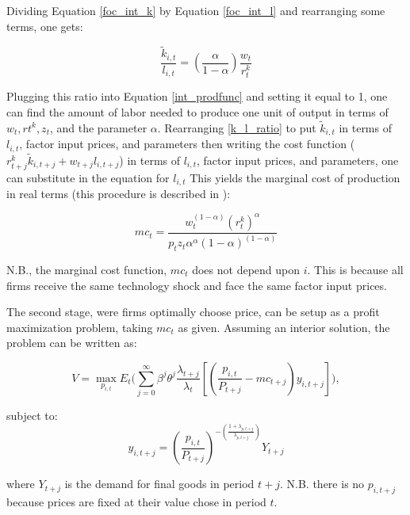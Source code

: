 \documentclass[article,11pt,letterpaper,fleqn]{article}
\theoremstyle{definition}
\numberwithin{equation}{section}
\newcommand{\cn}{\citeasnoun} %
\begin{document}
Dividing Equation \ref{foc_int_k} by Equation \ref{foc_int_l} and rearranging some terms, one gets:

\begin{equation}
\label{k_l_ratio}
\frac{\tilde{k}_{i,t}}{l_{i,t}}=\left(\frac{\alpha}{1-\alpha}\right)\frac{w_{t}}{r_{t}^{k}}
\end{equation}


Plugging this ratio into Equation \ref{int_prodfunc} and setting it equal to 1, one can find the amount of labor needed to produce one unit of output in terms of $w_{t}, r{t}^{k}, z_{t}$, and the parameter $\alpha$.  Rearranging \ref{k_l_ratio} to put $\tilde{k}_{i,t}$ in terms of $l_{i,t}$, factor input prices, and parameters then writing the cost function ($r_{t+j}^{k}\tilde{k}_{i,t+j}+w_{t+j}l_{i,t+j}$) in terms of $l_{i,t}$, factor input prices, and parameters, one can substitute in the equation for $l_{i,t}$ This yields the marginal cost of production in real terms (this procedure is described in \cn{FVRR2006}):

\begin{equation}
mc_{t}=\frac{w_{t}^{(1-\alpha)}(r_{t}^{k})^{\alpha}}{p_{t}z_{t}\alpha^{\alpha}(1-\alpha)^{(1-\alpha)}}
\end{equation}

\noindent\noindent N.B., the marginal cost function, $mc_{t}$ does not depend upon $i$.  This is because all firms receive the same technology shock and face the same factor input prices.

The second stage, were firms optimally choose price, can be setup as a profit maximization problem, taking $mc_{t}$ as given.  Assuming an interior solution, the problem can be written as:

\begin{equation}
V=\max_{p_{i,t}}E_{t}\Biggl(\sum_{j=0}^{\infty}\beta^{j}\theta^{j}\frac{\lambda_{t+j}}{\lambda_{t}}\left[\left(\frac{p_{i,t}}{P_{t+j}}-mc_{t+j}\right)y_{i,t+j}\right]\Biggr),
\end{equation}

\noindent\noindent subject to:
\begin{equation}
y_{i,t+j}=\left(\frac{p_{i,t}}{P_{t+j}}\right)^{-\left(\frac{1+\lambda_{p,t+j}}{\lambda_{p,t+j}}\right)}Y_{t+j}
\end{equation}

\noindent\noindent where $Y_{t+j}$ is the demand for final goods in period $t+j$.  N.B. there is no $p_{i,t+j}$ because prices are fixed at their value chose in period $t$.
\end{document}
